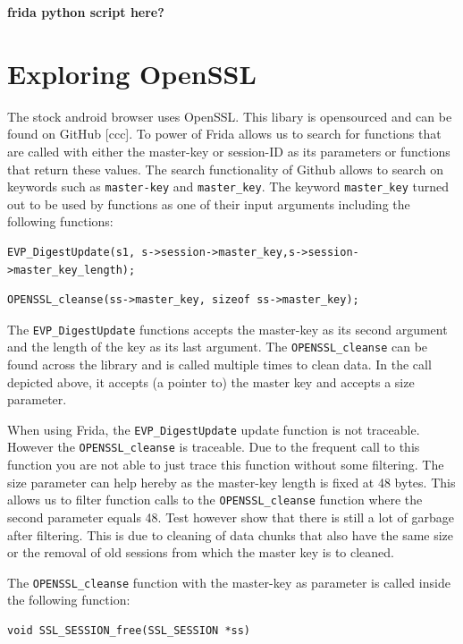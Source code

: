 \documentclass[12pt, a4paper]{report}
\begin{document}
\textbf{frida python script here?}
\clearpage

\section{Exploring OpenSSL}
The stock android browser uses OpenSSL. This libary is opensourced and can be found on GitHub [ccc]. To power of Frida allows us to search for functions that are called with either the master-key or session-ID as its parameters or functions that return these values. The search functionality of Github allows to search on keywords such as \texttt{master-key} and \texttt{master\_key}. The keyword \texttt{master\_key} turned out to be used by functions as one of their input arguments including the following functions:

\begin{lstlisting}[frame=single, breaklines=true]
EVP_DigestUpdate(s1, s->session->master_key,s->session->master_key_length);
\end{lstlisting}

\begin{lstlisting}[frame=single, breaklines=true]
OPENSSL_cleanse(ss->master_key, sizeof ss->master_key);
\end{lstlisting}

The \texttt{EVP\_DigestUpdate} functions accepts the master-key as its second argument and the length of the key as its last argument. The \texttt{OPENSSL\_cleanse} can be found across the library and is called multiple times to clean data. In the call depicted above, it accepts (a pointer to) the master key and accepts a size parameter. 

When using Frida, the \texttt{EVP\_DigestUpdate} update function is not traceable. However the \texttt{OPENSSL\_cleanse} is traceable. Due to the frequent call to this function you are not able to just trace this function without some filtering. The size parameter can help hereby as the master-key length is fixed at 48 bytes. This allows us to filter function calls to the \texttt{OPENSSL\_cleanse} function where the second parameter equals 48. Test however show that there is still a lot of garbage after filtering. This is due to cleaning of data chunks that also have the same size or the removal of old sessions from which the master key is to cleaned. 


\noindent The \texttt{OPENSSL\_cleanse} function with the master-key as parameter is called inside the following function:

\begin{lstlisting}[frame=single, breaklines=true]
void SSL_SESSION_free(SSL_SESSION *ss)
\end{lstlisting}
\end{document}
